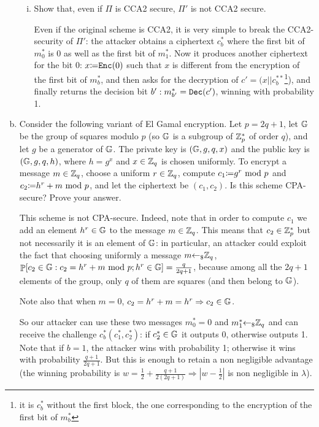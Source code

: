 \begin{enumerate}[(a)]
\begin{enumerate}[(i)]
		\item Show that, even if $\Pi$ is CCA2 secure, $\Pi'$ is not CCA2 secure.
		
		\begin{solution}
			Even if the original scheme is CCA2, it is very simple to break the CCA2-security of $\Pi'$: the attacker obtains a ciphertext $c_b^*$ where the first bit of $m_0^*$ is 0 as well as the first bit of $m_1^*$. Now it produces another ciphertext for the bit 0: $x {\coloneqq} \texttt{Enc}(0)$ such that $x$ is different from the encryption of the first bit of $m_b^*$, and then asks for the decryption of $c' = (x || c_b^{**}$\footnote{it is $c_b^*$ without the first block, the one corresponding to the encryption of the first bit of $m_b^*$}), and finally returns the decision bit $b': m_{b'}^* = \texttt{Dec}(c')$, winning with probability 1.
		\end{solution}
	\end{enumerate}

	\item Consider the following variant of El Gamal encryption. Let $p = 2q + 1$, let ${\mathbb G}$ be the group of squares modulo $p$ (so ${\mathbb G}$ is a subgroup of ${\mathbb Z}^*_p$ of order $q$), and let $g$ be a generator of ${\mathbb G}$. The private key is $({\mathbb G}, g, q, x)$ and the public key is $({\mathbb G}, g, q, h)$, where $h = g^x$ and $x \in {\mathbb Z}_q$ is chosen uniformly. To encrypt a message $m \in {\mathbb Z}_q$, choose a uniform $r \in {\mathbb Z}_q$, compute $c_1 {\coloneqq} g^r \mbox{ mod } p$ and $c_2 {\coloneqq} h^r + m \mbox{ mod } p$, and let the ciphertext be $(c_1, c_2)$. Is this scheme CPA-secure? Prove your answer.
	
	\begin{solution}
		This scheme is not CPA-secure. Indeed, note that in order to compute $c_1$ we add an element $ h^r \in {\mathbb G}$ to the message $m \in {\mathbb Z}_q$. This means that $c_2 \in {\mathbb Z}_p^*$ but not necessarily it is an element of ${\mathbb G}$: in particular, an attacker could exploit the fact that choosing uniformly a message $m {\leftarrow_\$} {\mathbb Z}_q$, $\mathop{\mathbb P}[c_2 \in {\mathbb G} : c_2 = h^r + m \mbox{ mod } p; h^r \in {\mathbb G}] = \frac{q}{2q+1}$, because among all the $2q + 1$ elements of the group, only $q$ of them are squares (and then belong to ${\mathbb G}$).
		
		Note also that when $m = 0$, $c_2 = h^r + m = h^r \Rightarrow c_2 \in {\mathbb G}$.

		So our attacker can use these two messages $m_0^* = 0$ and $m_1^* {\leftarrow_\$} {\mathbb Z}_q$ and can receive the challenge $c_b^* (c_1^*, c_2^*)$: if $c_2^* \in {\mathbb G}$ it outputs 0, otherwise outputs 1. Note that if $b=1$, the attacker wins with probability 1; otherwise it wins with probability $\frac{q + 1}{2q+1}$. But this is enough to retain a non negligible advantage (the winning probability is $w = \frac{1}{2} + \frac{q + 1}{2(2q + 1)} \Rightarrow |w - \frac{1}{2}| $ is non negligible in $\lambda$).
	\end{solution}
\end{enumerate}